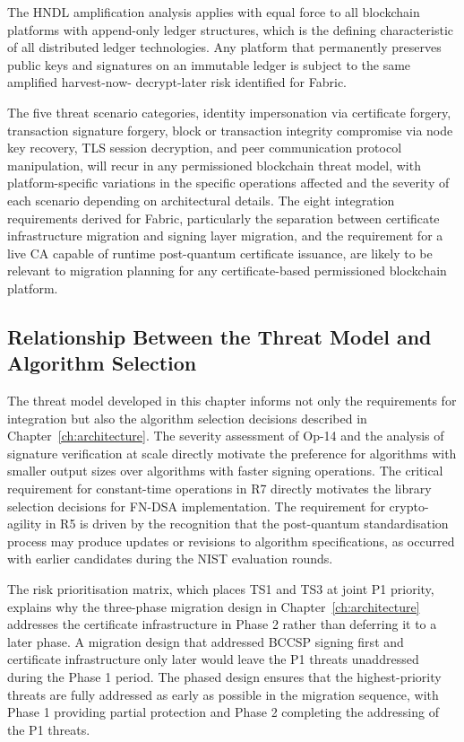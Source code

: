\documentclass[conference]{IEEEtran}
\begin{document}
The HNDL amplification analysis applies with equal force to all
blockchain platforms with append-only ledger structures, which is
the defining characteristic of all distributed ledger technologies.
Any platform that permanently preserves public keys and signatures
on an immutable ledger is subject to the same amplified harvest-now-
decrypt-later risk identified for Fabric.

The five threat scenario categories, identity impersonation via certificate
forgery, transaction signature forgery, block or transaction integrity
compromise via node key recovery, TLS session decryption, and peer
communication protocol manipulation, will recur in any permissioned
blockchain threat model, with platform-specific variations in the
specific operations affected and the severity of each scenario depending
on architectural details. The eight integration requirements derived for
Fabric, particularly the separation between certificate infrastructure
migration and signing layer migration, and the requirement for a live CA
capable of runtime post-quantum certificate issuance, are likely to be
relevant to migration planning for any certificate-based permissioned
blockchain platform.

\subsection{Relationship Between the Threat Model and Algorithm Selection}

The threat model developed in this chapter informs not only the
requirements for integration but also the algorithm selection decisions
described in Chapter~\ref{ch:architecture}. The severity assessment of
Op-14 and the analysis of signature verification at scale directly
motivate the preference for algorithms with smaller output sizes over
algorithms with faster signing operations. The critical requirement for
constant-time operations in R7 directly motivates the library selection
decisions for FN-DSA implementation. The requirement for crypto-agility
in R5 is driven by the recognition that the post-quantum standardisation
process may produce updates or revisions to algorithm specifications, as
occurred with earlier candidates during the NIST evaluation rounds.

The risk prioritisation matrix, which places TS1 and TS3 at joint P1
priority, explains why the three-phase migration design in
Chapter~\ref{ch:architecture} addresses the certificate infrastructure
in Phase 2 rather than deferring it to a later phase. A migration design
that addressed BCCSP signing first and certificate infrastructure only
later would leave the P1 threats unaddressed during the Phase 1 period.
The phased design ensures that the highest-priority threats are fully
addressed as early as possible in the migration sequence, with Phase 1
providing partial protection and Phase 2 completing the addressing of
the P1 threats.
\end{document}
